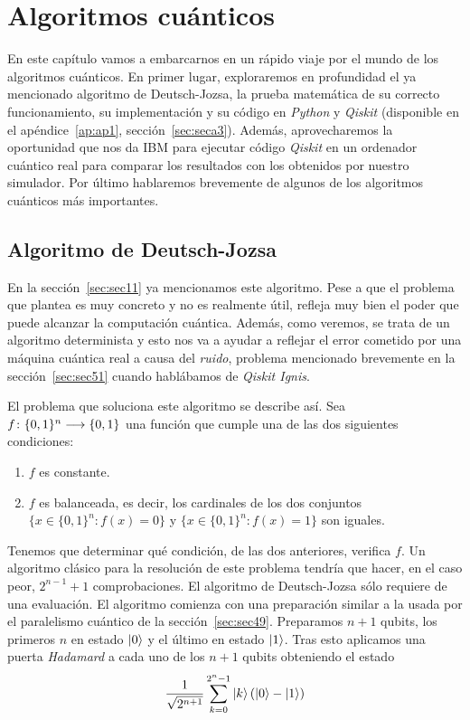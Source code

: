 \chapter{Algoritmos cuánticos}
\label{chapter6}

En este capítulo vamos a embarcarnos en un rápido viaje por el mundo de los algoritmos cuánticos. En primer lugar, exploraremos en profundidad el ya mencionado algoritmo de Deutsch-Jozsa, la prueba matemática de su correcto funcionamiento, su implementación y su código en \textit{Python} y \textit{Qiskit} (disponible en el apéndice~\ref{ap:ap1}, sección~\ref{sec:seca3}). Además,  aprovecharemos la oportunidad que nos da IBM para ejecutar código \textit{Qiskit} en un ordenador cuántico real para comparar los resultados con los obtenidos por nuestro simulador. Por último hablaremos brevemente de algunos de los algoritmos cuánticos más importantes.

\section{Algoritmo de Deutsch-Jozsa}
\label{sec:sec61}

En la sección~\ref{sec:sec11} ya mencionamos este algoritmo. Pese a que el problema que plantea es muy concreto y no es realmente útil, refleja muy bien el poder que puede alcanzar la computación cuántica. Además, como veremos, se trata de un algoritmo determinista y esto nos va a ayudar a reflejar el error cometido por una máquina cuántica real a causa del {\it ruido}, problema mencionado brevemente en la sección~\ref{sec:sec51} cuando hablábamos de \textit{Qiskit Ignis}.

El problema que soluciona este algoritmo se describe así. Sea $f\colon \{0,1\}^n\longrightarrow \{0,1\}$ una función que cumple una de las dos siguientes condiciones:
\begin{enumerate}
\item $f$ es constante.
\item $f$ es balanceada, es decir, los cardinales de los dos conjuntos $\{x\in{\{0,1\}^n}:f(x)=0\}$ y $\{x\in{\{0,1\}^n}:f(x)=1\}$ son iguales.
\end{enumerate}

Tenemos que determinar qué condición,  de las dos anteriores, verifica $f$. Un algoritmo clásico para la resolución de este problema tendría que hacer, en el caso peor, $2^{n-1}+1$ comprobaciones. El algoritmo de Deutsch-Jozsa sólo requiere de una evaluación. El algoritmo comienza con una preparación similar a la usada por el paralelismo cuántico de la sección~\ref{sec:sec49}. Preparamos $n+1$ qubits, los primeros $n$ en estado $\left|0\right\rangle$ y el último en estado $\left|1\right\rangle$. Tras esto aplicamos una puerta \textit{Hadamard} a cada uno de los $n+1$ qubits obteniendo el estado
\[\dfrac{1}{\sqrt{2^{n+1}}}\sum_{k=0}^{2^n-1}\left|k\right\rangle(\left|0\right\rangle -\left|1\right\rangle)\]

